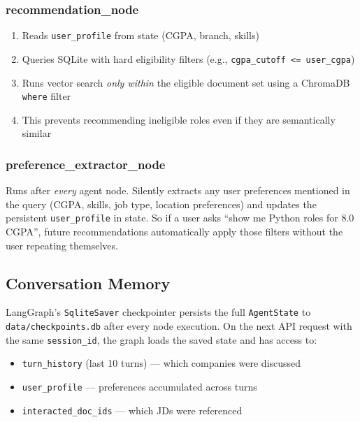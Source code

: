 \documentclass[12pt, a4paper]{article}
\begin{document}
\subsubsection{recommendation\_node}
\begin{enumerate}[noitemsep]
    \item Reads \texttt{user\_profile} from state (CGPA, branch, skills)
    \item Queries SQLite with hard eligibility filters (e.g., \texttt{cgpa\_cutoff <= user\_cgpa})
    \item Runs vector search \textit{only within} the eligible document set using a ChromaDB \texttt{where} filter
    \item This prevents recommending ineligible roles even if they are semantically similar
\end{enumerate}

\subsubsection{preference\_extractor\_node}
Runs after \textit{every} agent node. Silently extracts any user preferences mentioned in the query (CGPA, skills, job type, location preferences) and updates the persistent \texttt{user\_profile} in state. So if a user asks ``show me Python roles for 8.0 CGPA'', future recommendations automatically apply those filters without the user repeating themselves.

\subsection{Conversation Memory}

LangGraph's \texttt{SqliteSaver} checkpointer persists the full \texttt{AgentState} to \texttt{data/checkpoints.db} after every node execution. On the next API request with the same \texttt{session\_id}, the graph loads the saved state and has access to:

\begin{itemize}[noitemsep]
    \item \texttt{turn\_history} (last 10 turns) --- which companies were discussed
    \item \texttt{user\_profile} --- preferences accumulated across turns
    \item \texttt{interacted\_doc\_ids} --- which JDs were referenced
\end{itemize}

\end{document}
